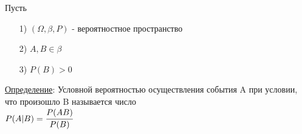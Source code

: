 
Пусть \\
\begin{enumerate}
\item[1)] $(\Omega, \beta, P)$ - вероятностное пространство \\

\item[2)] $A, B \in \beta$ \\

\item[3)] $P(B) > 0$ \\
\end{enumerate}
\underline{Определение}: Условной вероятностью осуществления события A при условии, что произошло B называется число \\
$P(A|B) = \cfrac{P(AB)}{P(B)}$ \\


